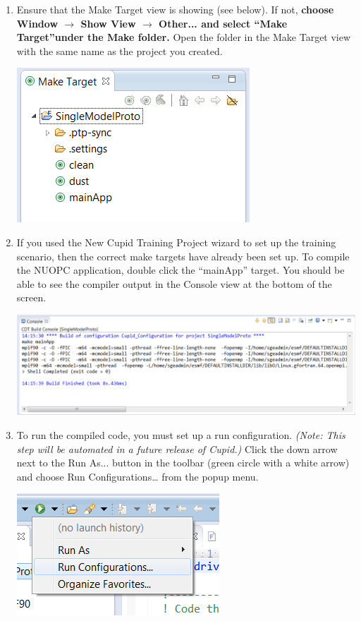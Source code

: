 \documentclass[oneside,11pt]{memoir}
\begin{document}
\begin{enumerate}

\item Ensure that the Make Target view is showing (see below).  If not, \textbf{choose Window $\rightarrow$ Show View $\rightarrow$ Other... and select ``Make Target''under the Make folder.}  Open the folder in the Make Target view with the same name as the project you created.

\parbox{\linewidth}{\centering
  \includegraphics{figs/cloudrun_fig1.png}
}

\item If you used the New Cupid Training Project wizard to set up the training scenario, then the correct make targets have already been set up.  To compile the NUOPC application, double click the ``mainApp'' target.  You should be able to see the compiler output in the Console view at the bottom of the screen.

\parbox{\linewidth}{\centering
  \includegraphics[width=\textwidth]{figs/cloudrun_fig2.png}
}

\item To run the compiled code, you must set up a run configuration.  \emph{(Note: This step will be automated in a future release of Cupid.)}  Click the down arrow next to the Run As... button in the toolbar (green circle with a white arrow) and choose Run Configurations… from the popup menu.

\parbox{\linewidth}{\centering
  \includegraphics{figs/cloudrun_fig3.png}
}


\end{enumerate}
\end{document}
